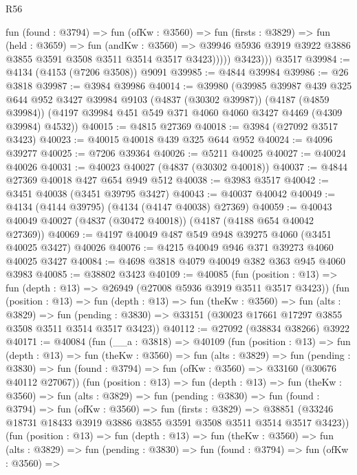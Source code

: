 \begin{lexlean}{R56}
\begin{coremodule}
                fun (found : @3794) =>
                fun (ofKw : @3560) =>
                fun (firsts : @3829) =>
                fun (held : @3659) =>
                fun (andKw : @3560) =>
                @39946 @5936 @3919 @3922 @3886 @3855 @3591 @3508 @3511 @3514 @3517 @3423)))))
          @3423)))
    @3517
@39984 := @4134 (@4153 (@7206 @3508)) @9091
@39985 := @4844 @39984
@39986 := @26 @3818
@39987 := @3984 @39986
@40014 := @39980
    (@39985
      @39987
      @439
      @325
      @644
      @952
      @3427
      @39984
      @9103
      (@4837 (@30302 @39987))
      (@4187 (@4859 @39984))
      (@4197 @39984 @451 @549 @371 @4060 @4060 @3427 @4469 (@4309 @39984) @4532))
@40015 := @4815 @27369
@40018 := @3984 (@27092 @3517 @3423)
@40023 := @40015 @40018 @439 @325 @644 @952
@40024 := @4096 @39277
@40025 := @7206 @39364
@40026 := @5211 @40025
@40027 := @40024 @40026
@40031 := @40023 @40027 (@4837 (@30302 @40018))
@40037 := @4844 @27369 @40018 @427 @654 @949 @512
@40038 := @3983 @3517
@40042 := @3451 @40038 (@3451 @39795 @3427)
@40043 := @40037 @40042
@40049 := @4134 (@4144 @39795) (@4134 (@4147 @40038) @27369)
@40059 := @40043 @40049 @40027 (@4837 (@30472 @40018)) (@4187 (@4188 @654 @40042 @27369))
@40069 := @4197 @40049 @487 @549 @948 @39275 @4060 (@3451 @40025 @3427) @40026
@40076 := @4215 @40049 @946 @371 @39273 @4060 @40025 @3427
@40084 := @4698 @3818 @4079 @40049 @382 @363 @945 @4060 @3983
@40085 := @38802 @3423
@40109 := @40085
    (fun (position : @13) => fun (depth : @13) => @26949 (@27008 @5936 @3919 @3511 @3517 @3423))
    (fun (position : @13) =>
    fun (depth : @13) =>
    fun (theKw : @3560) =>
    fun (alts : @3829) =>
    fun (pending : @3830) => @33151 (@30023 @17661 @17297 @3855 @3508 @3511 @3514 @3517 @3423))
@40112 := @27092 (@38834 @38266) @3922
@40171 := @40084
    (fun (__a : @3818) =>
    @40109
      (fun (position : @13) =>
      fun (depth : @13) =>
      fun (theKw : @3560) =>
      fun (alts : @3829) =>
      fun (pending : @3830) =>
      fun (found : @3794) => fun (ofKw : @3560) => @33160 (@30676 @40112 @27067))
      (fun (position : @13) =>
      fun (depth : @13) =>
      fun (theKw : @3560) =>
      fun (alts : @3829) =>
      fun (pending : @3830) =>
      fun (found : @3794) =>
      fun (ofKw : @3560) =>
      fun (firsts : @3829) =>
      @38851 (@33246 @18731 @18433 @3919 @3886 @3855 @3591 @3508 @3511 @3514 @3517 @3423))
      (fun (position : @13) =>
      fun (depth : @13) =>
      fun (theKw : @3560) =>
      fun (alts : @3829) =>
      fun (pending : @3830) =>
      fun (found : @3794) =>
      fun (ofKw : @3560) =>

\end{coremodule}
\end{lexlean}
